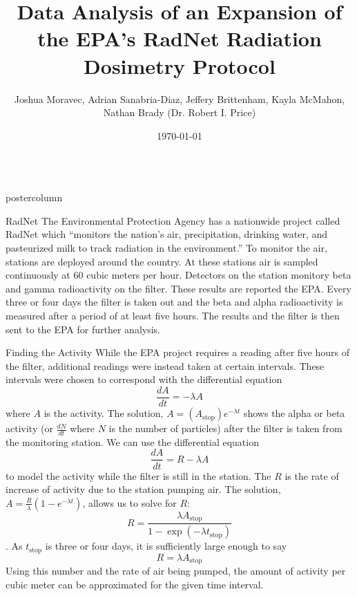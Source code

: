 \documentclass[final,hyperref={pdfpagelabels=false}]{beamer}
\title{Data Analysis of an Expansion of the EPA’s RadNet Radiation Dosimetry Protocol}
\author{Joshua Moravec, Adrian Sanabria-Diaz, Jeffery Brittenham, Kayla McMahon, Nathan Brady (Dr. Robert I. Price)}
\institute[University of Nebraska at Kearney]{Physics Department, University of Nebraska at Kearney, Kearney, Nebraska}
\date[\today]{\today}
\renewcommand{\d}[2]{\frac{d #1}{d #2}}
\newlength{\columnheight}
\begin{document}
\begin{frame}
	\begin{columns}
		\begin{column}{.49\textwidth}
			\begin{beamercolorbox}[center,wd=\textwidth]{postercolumn}
				\begin{minipage}[T]{.95\textwidth}
					\parbox[t][\columnheight]{\textwidth}{
						\begin{block}{RadNet}
						The Environmental Protection Agency has a nationwide project called RadNet which ``monitors the nation's air, precipitation, drinking water, and pasteurized milk to track radiation in the environment.'' To monitor the air, stations are deployed around the country. At these stations air is sampled continuously at 60 cubic meters per hour. Detectors on the station monitory beta and gamma radioactivity on the filter. These results are reported the EPA. Every three or four days the filter is taken out and the beta and alpha radioactivity is measured after a period of at least five hours. The results and the filter is then sent to the EPA for further analysis.
						\end{block}
						\vfill
						\begin{block}{Finding the Activity}
						While the EPA project requires a reading after five hours of the filter, additional readings were instead taken at certain intervals. These intervals were chosen to correspond with the differential equation \[\d{A}{t} = -\lambda A\] where $A$ is the activity. The solution, $A = \left(A_{\text{stop}}\right)e^{-\lambda t}$ shows the alpha or beta activity (or $\d{N}{t}$ where $N$ is the number of particles) after the filter is taken from the monitoring station. We can use the differential equation \[\d{A}{t} = R - \lambda A\] to model the activity while the filter is still in the station. The $R$ is the rate of increase of activity due to the station pumping air. The solution, $A = \frac{R}{\lambda}\left(1-e^{-\lambda t}\right)$, allows us to solve for $R$: \[R = \frac{\lambda A_{\text{stop}}}{1-\exp(-\lambda t_{\text{stop}})}\]. As $t_{\text{stop}}$ is three or four days, it is sufficiently large enough to say \[R = \lambda A_{\text{stop}}\] Using this number and the rate of air being pumped, the amount of activity per cubic meter can be approximated for the given time interval.
						\end{block}
					}
				\end{minipage}
			\end{beamercolorbox}
		\end{column}


\end{columns}
\end{frame}
\end{document}
